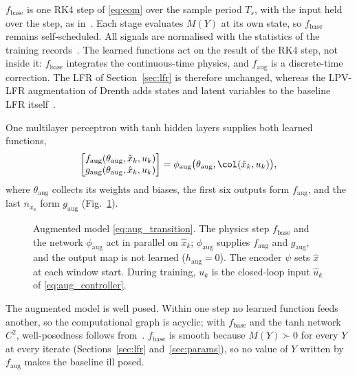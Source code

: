 $f_{\mathrm{base}}$ is one RK4 step of \eqref{eq:eom} over the sample
period $T_s$, with the input held over the step, as
in~\cite[Sec.~7.2]{hoekstra2026lfr}.
Each stage evaluates $M(Y)$ at its own state, so $f_{\mathrm{base}}$
remains self-scheduled.
All signals are normalised with the statistics of the training
records~\cite[Sec.~5.3]{hoekstra2026lfr}.
The learned functions act on the result of the RK4 step, not inside it:
$f_{\mathrm{base}}$ integrates the continuous-time physics, and
$f_{\mathrm{aug}}$ is a discrete-time correction.
The LFR of Section~\ref{sec:lfr} is therefore unchanged, whereas the
LPV-LFR augmentation of Drenth adds states and latent variables to the
baseline LFR itself~\cite[Sec.~5.2]{drenth2025thesis}.

One multilayer perceptron with tanh hidden layers supplies both learned
functions,
\begin{equation}
 \begin{bmatrix}
  f_{\mathrm{aug}}(\theta_{\mathrm{aug}},\hat x_k,u_k)\\
  g_{\mathrm{aug}}(\theta_{\mathrm{aug}},\hat x_k,u_k)
 \end{bmatrix}
 =\phi_{\mathrm{aug}}\bigl(\theta_{\mathrm{aug}},\col(\hat x_k,u_k)\bigr),
 \label{eq:aug_mlp}
\end{equation}
where $\theta_{\mathrm{aug}}$ collects its weights and biases, the first
six outputs form $f_{\mathrm{aug}}$, and the last $n_{x_a}$ form
$g_{\mathrm{aug}}$ (Fig.~\ref{fig:aug_structure}).

\begin{figure}[t]
 \centering
 \resizebox{\columnwidth}{!}{}
 \caption{Augmented model \eqref{eq:aug_transition}. The physics step
 $f_{\mathrm{base}}$ and the network $\phi_{\mathrm{aug}}$ act in parallel
 on $\hat x_k$; $\phi_{\mathrm{aug}}$ supplies $f_{\mathrm{aug}}$ and
 $g_{\mathrm{aug}}$, and the output map is not learned
 ($h_{\mathrm{aug}}=0$). The encoder $\psi$ sets $\hat x$ at each window
 start. During training, $u_k$ is the closed-loop input $\hat u_k$ of
 \eqref{eq:aug_controller}.}
 \label{fig:aug_structure}
\end{figure}

The augmented model is well posed.
Within one step no learned function feeds another, so the computational
graph is acyclic; with $f_{\mathrm{base}}$ and the tanh network $C^2$,
well-posedness follows from~\cite[Thm.~9]{hoekstra2026lfr}.
$f_{\mathrm{base}}$ is smooth because $M(Y)\succ0$ for every $Y$ at every
iterate (Sections~\ref{sec:lfr} and~\ref{sec:params}), so no value of $Y$
written by $f_{\mathrm{aug}}$ makes the baseline ill posed.

